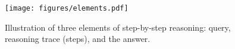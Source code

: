 





\begin{figure}[tb]
    \centering
    \texttt{[image: figures/elements.pdf]}
    \caption{Illustration of three elements of step-by-step reasoning: query, reasoning trace (steps), and the answer.}
    \label{fig:elements}
\end{figure}

